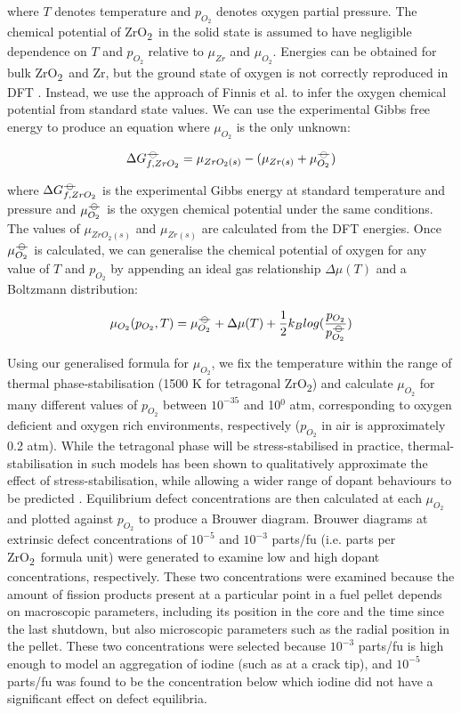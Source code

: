 \documentclass[11pt,a4paper]{article}
\newcommand{\zirconia}{ZrO\textsubscript{2}}
\newcommand*{\plimsoll}{{\ensuremath{-\kern-4pt{\ominus}\kern-4pt-}}}
\begin{document}
where $T$ denotes temperature and $p_{O_2}$ denotes oxygen partial pressure. The chemical potential of \zirconia\ in the solid state is assumed to have negligible dependence on $T$ and $p_{O_2}$ relative to ${\mu}_{Zr}$ and ${\mu}_{O_2}$. Energies can be obtained for bulk \zirconia\ and Zr, but the ground state of oxygen is not correctly reproduced in DFT \cite{Batyrev2000, Lozovoi2001}. Instead, we use the approach of Finnis et al. \cite{Finnis2005} to infer the oxygen chemical potential from standard state values. We can use the experimental Gibbs free energy to produce an equation where $\mu_{O_2}$ is the only unknown:

\begin{equation}
\Delta{G^{\plimsoll}_{f, ZrO_2}} = \mu_{ZrO_2(s)} - (\mu_{Zr(s)} + \mu^{\plimsoll}_{O_2})
\end{equation}

where $\Delta{G^{\plimsoll}_{f, ZrO_2}}$ is the experimental Gibbs energy at standard temperature and pressure and $\mu^{\plimsoll}_{O_2}$ is the oxygen chemical potential under the same conditions. The values of $\mu_{ZrO_2(s)}$ and $\mu_{Zr(s)}$ are calculated from the DFT energies. Once $\mu^{\plimsoll}_{O_2}$ is calculated, we can generalise the chemical potential of oxygen for any value of $T$ and $p_{O_2}$ by appending an ideal gas relationship $\Delta{\mu(T)}$ and a Boltzmann distribution:

\begin{equation}
\mu_{O_2}(p_{O_2},T) = \mu^{\plimsoll}_{O_2} + \Delta{\mu(T)} + \frac{1}{2}{k_B}log(\frac{p_{O_2}}{p^{\plimsoll}_{O_2}})
\end{equation}

Using our generalised formula for $\mu_{O_2}$, we fix the temperature within the range of thermal phase-stabilisation (1500 K for tetragonal \zirconia) and calculate $\mu_{O_2}$ for many different values of $p_{O_2}$ between $10^{-35}$ and 10$^{0}$ atm, corresponding to oxygen deficient and oxygen rich environments, respectively ($p_{O_2}$ in air is approximately 0.2 atm). While the tetragonal phase will be stress-stabilised in practice, thermal-stabilisation in such models has been shown to qualitatively approximate the effect of stress-stabilisation, while allowing a wider range of dopant behaviours to be predicted \cite{Bell2016}. Equilibrium defect concentrations are then calculated at each $\mu_{O_2}$ and plotted against $p_{O_2}$ to produce a Brouwer diagram. Brouwer diagrams at extrinsic defect concentrations of $10^{-5}$ and $10^{-3}$ parts/fu (i.e. parts per \zirconia\ formula unit) were generated to examine low and high dopant concentrations, respectively. These two concentrations were examined because the amount of fission products present at a particular point in a fuel pellet depends on macroscopic parameters, including its position in the core and the time since the last shutdown, but also microscopic parameters such as the radial position in the pellet. These two concentrations were selected because $10^{-3}$ parts/fu is high enough to model an aggregation of iodine (such as at a crack tip), and $10^{-5}$ parts/fu was found to be the concentration below which iodine did not have a significant effect on defect equilibria. 
\end{document}
